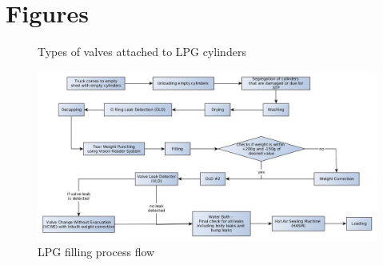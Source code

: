 \documentclass{report}
\begin{document}
	\section{Figures}
	\begin{figure}[h]
		\centering
		\caption{Types of valves attached to LPG cylinders}
		\label{lpg_valves}
	\end{figure}
	\begin{figure}[h]
		\includegraphics[width=\linewidth]{lpg_flow}
		\caption{LPG filling process flow}
		\label{lpg_flow}
	\end{figure}
\end{document}
